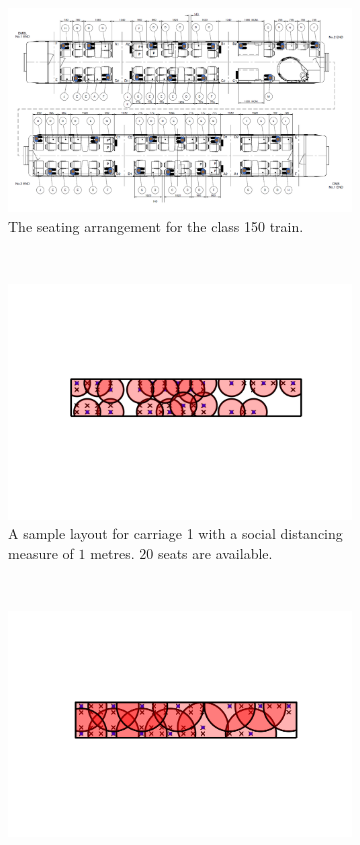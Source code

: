 \documentclass[11pt,a4paper]{article}
\begin{document}
\begin{figure}[ht!]
\centering
\begin{subfigure}[h]{0.95\linewidth}
\centering
\includegraphics[scale = 0.6]{floorplan150.png}
\caption{The seating arrangement for the class 150 train.}
\label{Reference}
\end{subfigure}
~
\begin{subfigure}[h]{0.49\linewidth}
\centering
\includegraphics[width = \linewidth]{class150_first_car_1m.png}
\caption{A sample layout for carriage 1 with a social distancing measure of $1$ metres. $20$ seats are available.}
\label{OneMetre1}
\end{subfigure}
~
\begin{subfigure}[h]{0.490\linewidth}
\centering
\includegraphics[width = \linewidth]{class150_first_car_2m.png}

\end{subfigure}
\end{figure}
\end{document}
